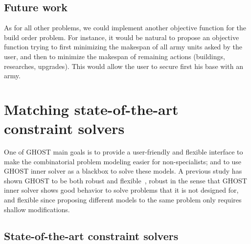 \documentclass[journal]{IEEEtran}
\newcommand{\ghost}{\textsc{GHOST}\xspace}
\begin{document}
\subsection{Future work}

As  for  all other  problems,  we  could implement  another  objective
function  for the  build  order  problem. For  instance,  it would  be
natural to  propose an objective  function trying to  first minimizing
the makespan of all army units asked by the user, and then to minimize
the   makespan   of    remaining   actions   (buildings,   researches,
upgrades). This would allow the user  to secure first his base with an
army.



\section{Matching state-of-the-art constraint solvers}\label{sec:SOTA}

One  of \ghost  main goals  is  to provide  a user-friendly and  flexible
interface   to  make  the  combinatorial   problem  modeling  easier for
non-specialists; and to use \ghost inner solver as a blackbox to solve
these models. A previous study has  shown \ghost to be both robust and
flexible~\cite{aiide15_rts},  robust in  the sense  that \ghost  inner
solver shows good  behavior to solve problems that it is  not designed for,
and flexible since proposing different models to the same problem only
requires shallow modifications.

\subsection{State-of-the-art constraint solvers}
\end{document}
